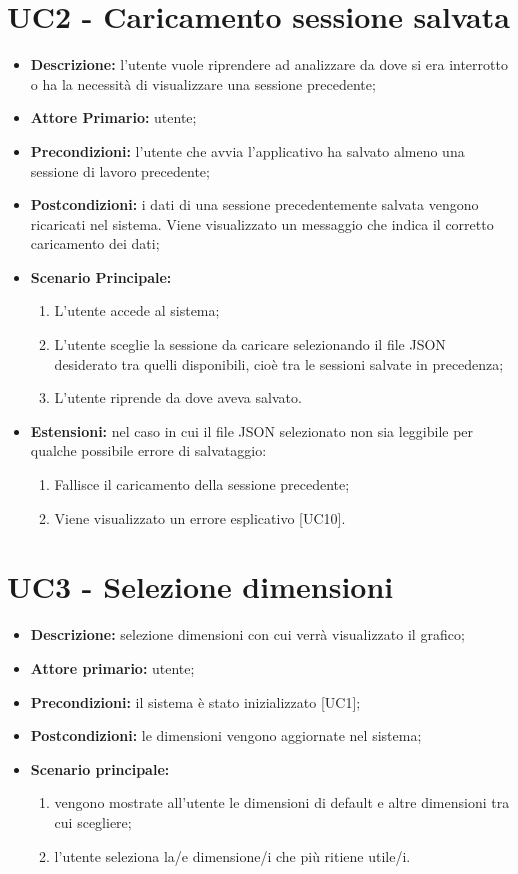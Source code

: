 \section{UC2 - Caricamento sessione salvata}
\begin{itemize}
  \item \textbf{Descrizione:} l'utente vuole riprendere ad analizzare da dove si era interrotto
  o ha la necessità di visualizzare una sessione precedente;
  \item \textbf{Attore Primario:} utente;
  \item \textbf{Precondizioni:} l'utente che avvia l'applicativo ha salvato almeno una sessione di lavoro precedente;
  \item \textbf{Postcondizioni:} i dati di una sessione precedentemente salvata vengono ricaricati nel sistema. Viene visualizzato un messaggio che indica il corretto caricamento dei dati;
  \item \textbf{Scenario Principale:}
  \begin{enumerate}
    \item L'utente accede al sistema;
    \item L'utente sceglie la sessione da caricare selezionando il file JSON desiderato tra quelli disponibili,
    cioè tra le sessioni salvate in precedenza;
    \item L'utente riprende da dove aveva salvato.
  \end{enumerate}
  \item \textbf{Estensioni:} nel caso in cui il file JSON selezionato non sia leggibile per qualche possibile errore di salvataggio:
    \begin{enumerate}
      \item Fallisce il caricamento della sessione precedente;
      \item Viene visualizzato un errore esplicativo [UC10].
    \end{enumerate}
\end{itemize}


\section{UC3 - Selezione dimensioni}
 \begin{itemize}
     \item \textbf{Descrizione:} selezione dimensioni con cui verrà visualizzato il grafico;
     \item \textbf{Attore primario:} utente;
     \item \textbf{Precondizioni:} il sistema è stato inizializzato [UC1];
     \item \textbf{Postcondizioni:} le dimensioni vengono aggiornate nel sistema;
     \item \textbf{Scenario principale:}
     \begin{enumerate}
         \item vengono mostrate all'utente le dimensioni di default e altre dimensioni tra cui scegliere;
         \item l'utente seleziona la/e dimensione/i che più ritiene utile/i.
     \end{enumerate}
 \end{itemize}


